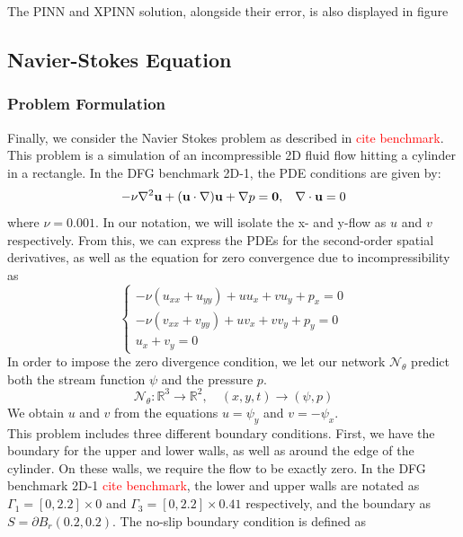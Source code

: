 The PINN and XPINN solution, alongside their error, is also displayed in figure \textcolor{red}{}

\subsection{Navier-Stokes Equation}
\subsubsection{Problem Formulation}
Finally, we consider the Navier Stokes problem as described in \textcolor{red}{cite benchmark}. This problem is a simulation of an incompressible 2D fluid flow hitting a cylinder in a rectangle. In the DFG benchmark 2D-1, the PDE conditions are given by:
\begin{equation}
    -\nu \nabla^2 \mathbf{u} + (\mathbf{u} \cdot \nabla)\mathbf{u} + \nabla p = \mathbf{0}, \hspace{3mm} \nabla \cdot \mathbf{u} = 0
\end{equation}
where $\nu = 0.001$. In our notation, we will isolate the x- and y-flow as $u$ and $v$ respectively. From this, we can express the PDEs for the second-order spatial derivatives, as well as the equation for zero convergence due to incompressibility as
\begin{equation}
\begin{cases}
-\nu(u_{xx} + u_{yy})+uu_x+vu_y+p_x = 0 \\
-\nu(v_{xx} + v_{yy})+uv_x+vv_y+p_y = 0 \\
u_x + v_y = 0
\end{cases}
\end{equation}
In order to impose the zero divergence condition, we let our network $\mathcal{N}_\theta$ predict both the stream function $\psi$ and the pressure $p$.
\begin{equation}
    \mathcal{N}_\theta : \mathbb{R}^3 \to \mathbb{R}^2, \quad (x,y,t)\to (\psi, p)
\end{equation}
We obtain $u$ and $v$ from the equations $u=\psi_y$ and $v=-\psi_x$. \\
This problem includes three different boundary conditions. First, we have the boundary for the upper and lower walls, as well as around the edge of the cylinder. On these walls, we require the flow to be exactly zero. In the DFG benchmark 2D-1 \textcolor{red}{cite benchmark}, the lower and upper walls are notated as $\Gamma_1 = [0,2.2]\times 0$ and $\Gamma_3 = [0,2.2]\times 0.41$ respectively, and the boundary as $S=\partial B_r(0.2,0.2)$. The no-slip boundary condition is defined as

